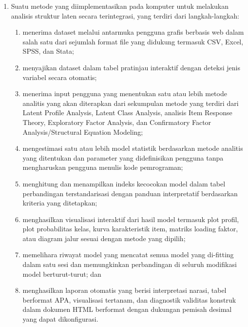\documentclass[12pt,a4paper]{article}
\begin{document}
\begin{enumerate}[leftmargin=3em, labelsep=1em, itemsep=12pt]
\item Suatu metode yang diimplementasikan pada komputer untuk melakukan analisis struktur laten secara terintegrasi, yang terdiri dari langkah-langkah:
\begin{enumerate}[label=\alph*., leftmargin=2em, itemsep=2pt]
\item menerima dataset melalui antarmuka pengguna grafis berbasis web dalam salah satu dari sejumlah format file yang didukung termasuk CSV, Excel, SPSS, dan Stata;
\item menyajikan dataset dalam tabel pratinjau interaktif dengan deteksi jenis variabel secara otomatis;
\item menerima input pengguna yang menentukan satu atau lebih metode analitis yang akan diterapkan dari sekumpulan metode yang terdiri dari Latent Profile Analysis, Latent Class Analysis, analisis Item Response Theory, Exploratory Factor Analysis, dan Confirmatory Factor Analysis/Structural Equation Modeling;
\item mengestimasi satu atau lebih model statistik berdasarkan metode analitis yang ditentukan dan parameter yang didefinisikan pengguna tanpa mengharuskan pengguna menulis kode pemrograman;
\item menghitung dan menampilkan indeks kecocokan model dalam tabel perbandingan terstandarisasi dengan panduan interpretatif berdasarkan kriteria yang ditetapkan;
\item menghasilkan visualisasi interaktif dari hasil model termasuk plot profil, plot probabilitas kelas, kurva karakteristik item, matriks loading faktor, atau diagram jalur sesuai dengan metode yang dipilih;
\item memelihara riwayat model yang mencatat semua model yang di-fitting dalam satu sesi dan memungkinkan perbandingan di seluruh modifikasi model berturut-turut; dan
\item menghasilkan laporan otomatis yang berisi interpretasi narasi, tabel berformat APA, visualisasi tertanam, dan diagnostik validitas konstruk dalam dokumen HTML berformat dengan dukungan pemisah desimal yang dapat dikonfigurasi.
\end{enumerate}

\end{enumerate}
\end{document}

